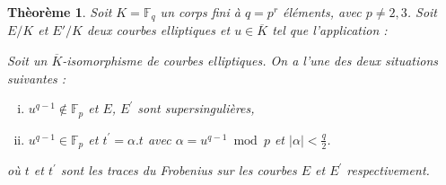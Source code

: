 \documentclass[a4paper]{article} %
\numberwithin{equation}{section}
\newcommand\GF[1]{\mathbb{F}_{#1}}
\begin{document}
\newtheorem{thm}{Thèorème}[section]
\newtheorem{lem}[thm]{Lemme}
\newtheorem{cor}{Corollaire}[thm]
\newtheorem{prop}[thm]{Proposition}
\theoremstyle{definition}
\newtheorem{defn}[thm]{Définition}
\newtheorem*{ex}{Exemple}
\theoremstyle{remark}
\newtheorem{rem}{Remarque}[thm]

\begin{thm}Soit $K = \GF{q}$ un corps fini à $q = p^r$ éléments, avec 
$p\neq2,3$. Soit $E/K$ et $E'/K$ deux courbes elliptiques et $u\in\overline{K}$
 tel que l'application :

\begin{center}
\end{center}
Soit un $\overline{K}$-isomorphisme de courbes elliptiques. On a l'une des deux
situations suivantes :

\begin{enumerate}[i)]
    \item $u^{q-1}\not\in \GF{p}$ et $E$, $E^{\prime}$ sont supersingulières,
    \item $u^{q-1}\in \GF{p}$ et $t^{\prime} = \alpha.t$ avec $\alpha = u^{q-1}
             \bmod p$ et $|\alpha| < \tfrac{q}{2}$.
\end{enumerate}
où $t$ et $t^{\prime}$ sont les traces du Frobenius sur les courbes $E$ et 
$E^{\prime}$ respectivement.
\end{thm}
\end{document}
